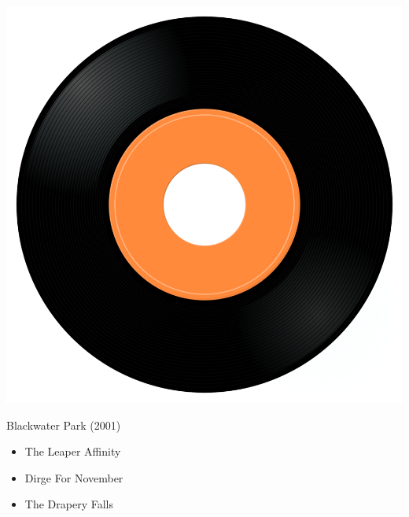 \begin{minipage}[t]{0.25\textwidth}
\captionsetup{type=figure}
\includegraphics[width=\textwidth]{Images/cover.png}
\caption*{Blackwater Park (2001)}
\end{minipage}
\begin{minipage}[t]{0.25\textwidth}\vspace{0pt}
\begin{itemize}[nosep,leftmargin=1em,labelwidth=*,align=left]
	\setlength{\itemsep}{0pt}
	\item The Leaper Affinity
	\item Dirge For November
	\item The Drapery Falls
\end{itemize}
\end{minipage}
